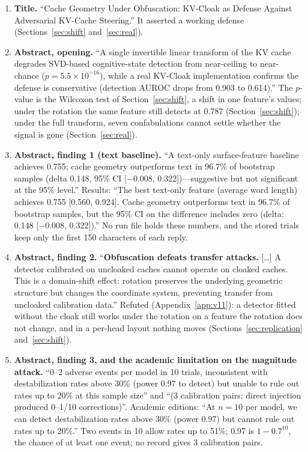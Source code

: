 \documentclass[11pt,a4paper]{article}
\begin{document}
\begin{enumerate}
\item \textbf{Title.} ``Cache Geometry Under Obfuscation: KV-Cloak as
Defense Against Adversarial KV-Cache Steering.'' It asserted a working
defense (Sections~\ref{sec:shift} and~\ref{sec:real}).

\item \textbf{Abstract, opening.} ``A single invertible linear transform
of the KV cache degrades SVD-based cognitive-state detection from
near-ceiling to near-chance ($p = 5.5 \times 10^{-16}$), while a real
KV-Cloak implementation confirms the defense is conservative (detection
AUROC drops from 0.903 to 0.614).'' The $p$-value is the Wilcoxon test of
Section~\ref{sec:shift}, a shift in one feature's values; under the
rotation the same feature still detects at 0.787
(Section~\ref{sec:shift}); under the full transform, seven confabulations
cannot settle whether the signal is gone (Section~\ref{sec:real}).

\item \textbf{Abstract, finding 1 (text baseline).} ``A text-only
surface-feature baseline achieves 0.755; cache geometry outperforms text
in 96.7\% of bootstrap samples (delta 0.148, 95\% CI [$-$0.008,
0.322])---suggestive but not significant at the 95\% level.'' Results:
``The best text-only feature (average word length) achieves 0.755 [0.560,
0.924]. Cache geometry outperforms text in 96.7\% of bootstrap samples,
but the 95\% CI on the difference includes zero (delta: 0.148 [$-$0.008,
0.322]).'' No run file holds these numbers, and the stored trials keep
only the first 150 characters of each reply.

\item \textbf{Abstract, finding 2.} ``\textbf{Obfuscation defeats
transfer attacks.} [\ldots] A detector calibrated on uncloaked caches
cannot operate on cloaked caches. This is a domain-shift effect: rotation
preserves the underlying geometric structure but changes the coordinate
system, preventing transfer from uncloaked calibration data.''
Refuted (Appendix~\ref{app:v11}): a detector fitted without the cloak
still works under the rotation on a feature the rotation does not
change, and in a per-head layout nothing moves
(Sections~\ref{sec:replication} and~\ref{sec:shift}).

\item \textbf{Abstract, finding 3, and the academic limitation on the
magnitude attack.} ``0--2 adverse events per model in 10 trials,
inconsistent with destabilization rates above 30\% (power 0.97 to detect)
but unable to rule out rates up to 20\% at this sample size'' and ``(3
calibration pairs; direct injection produced 0--1/10 corrections)''.
Academic editions: ``At $n=10$ per model, we can detect destabilization
rates above 30\% (power 0.97) but cannot rule out rates up to 20\%.'' Two
events in 10 allow rates up to 51\%; 0.97 is $1 - 0.7^{10}$, the chance of
at least one event; no record gives 3 calibration pairs.


\end{enumerate}
\end{document}
